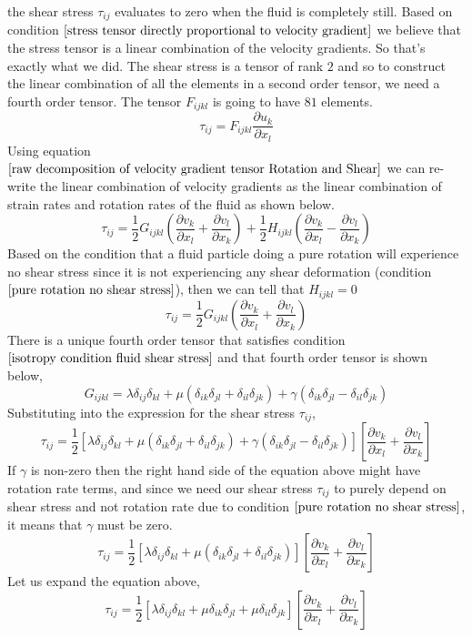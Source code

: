 the shear stress $\tau_{ij}$ evaluates to zero when the fluid is completely still.
Based on condition $\ref{stress tensor directly proportional to velocity gradient}$ we believe that the stress tensor is a linear combination of the velocity gradients.
So that's exactly what we did.
The shear stress is a tensor of rank $2$ and so to construct the linear combination of all the elements in a second order tensor, we need a fourth order tensor.
The tensor $F_{ijkl}$ is going to have $81$ elements.
$$\tau_{ij} = F_{ijkl}\frac{\partial u_{k}}{\partial x_{l}}$$
Using equation $\ref{raw decomposition of velocity gradient tensor Rotation and Shear}$ we can re-write the linear combination of velocity gradients as the linear combination of strain rates and rotation rates of the fluid as shown below.
$$\tau_{ij} = \frac{1}{2}G_{ijkl}\left(\frac{\partial v_{k}}{\partial x_{l}} + \frac{\partial v_{l}}{\partial x_{k}}\right) + \frac{1}{2}H_{ijkl}\left(\frac{\partial v_{k}}{\partial x_{l}} - \frac{\partial v_{l}}{\partial x_{k}}\right)$$
Based on the condition that a fluid particle doing a pure rotation will experience no shear stress since it is not experiencing any shear deformation (condition $\ref{pure rotation no shear stress}$), then we can tell that $H_{ijkl} = 0$
$$\tau_{ij} = \frac{1}{2}G_{ijkl}\left(\frac{\partial v_{k}}{\partial x_{l}} + \frac{\partial v_{l}}{\partial x_{k}}\right)$$
There is a unique fourth order tensor that satisfies condition $\ref{isotropy condition fluid shear stress}$ and that fourth order tensor is shown below,
$$G_{ijkl} = \lambda \delta_{ij}\delta_{kl} + \mu(\delta_{ik}\delta_{jl} + \delta_{il}\delta_{jk}) + \gamma(\delta_{ik}\delta_{jl} - \delta_{il}\delta_{jk})$$
Substituting into the expression for the shear stress $\tau_{ij}$,
$$\tau_{ij} = \frac{1}{2}[\lambda \delta_{ij}\delta_{kl} + \mu(\delta_{ik}\delta_{jl} + \delta_{il}\delta_{jk}) + \gamma(\delta_{ik}\delta_{jl} - \delta_{il}\delta_{jk})]\left[\frac{\partial v_{k}}{\partial x_{l}} + \frac{\partial v_{l}}{\partial x_{k}}\right]$$
If $\gamma$ is non-zero then the right hand side of the equation above might have rotation rate terms, and since we need our shear stress $\tau_{ij}$ to purely depend on shear stress and not rotation rate due to condition $\ref{pure rotation no shear stress}$, it means that $\gamma$ must be zero.
$$\tau_{ij} = \frac{1}{2}[\lambda \delta_{ij}\delta_{kl} + \mu(\delta_{ik}\delta_{jl} + \delta_{il}\delta_{jk})]\left[\frac{\partial v_{k}}{\partial x_{l}} + \frac{\partial v_{l}}{\partial x_{k}}\right]$$
Let us expand the equation above,
$$\tau_{ij} = \frac{1}{2}[\lambda \delta_{ij}\delta_{kl} + \mu\delta_{ik}\delta_{jl} + \mu\delta_{il}\delta_{jk}]\left[\frac{\partial v_{k}}{\partial x_{l}} + \frac{\partial v_{l}}{\partial x_{k}}\right]$$
